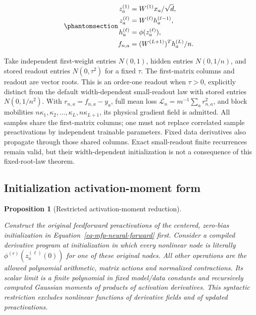 \documentclass[
  11pt,
]{article}
\theoremstyle{definition}
\theoremstyle{plain}
\theoremstyle{plain}
\newtheorem{proposition}{Proposition}[section]
\theoremstyle{plain}
\theoremstyle{remark}
\begin{document}
\begin{equation}\protect\phantomsection\label{eq-mfp-neural-forward}{
\begin{aligned}
z_a^{(1)}&=W^{(1)}x_a/\sqrt d,\\
z_a^{(\ell)}&=W^{(\ell)}h_a^{(\ell-1)},\\
h_a^{(\ell)}&=\phi(z_a^{(\ell)}),\\
f_{n,a}&=(W^{(L+1)})^Th_a^{(L)}/n.
\end{aligned}
}\end{equation}

Take independent first-weight entries \(N(0,1)\), hidden entries
\(N(0,1/n)\), and stored readout entries \(N(0,\tau^2)\) for a fixed
\(\tau\). The first-matrix columns and readout are vector roots. This is
an order-one readout when \(\tau>0\), explicitly distinct from the
default width-dependent small-readout law with stored entries
\(N(0,1/n^2)\). With \(r_{n,a}=f_{n,a}-y_a\), full mean loss
\(\mathcal L_n=m^{-1}\sum_a r_{n,a}^2\), and block mobilities
\(n\kappa_1,\kappa_2,\ldots,\kappa_L,n\kappa_{L+1}\), its physical
gradient field is admitted. All samples share the first-matrix columns;
one must not replace correlated sample preactivations by independent
trainable parameters. Fixed data derivatives also propagate through
those shared columns. Exact small-readout finite recurrences remain
valid, but their width-dependent initialization is not a consequence of
this fixed-root-law theorem.

\subsection{Initialization activation-moment
form}\label{sec-mfp-initialization-normal-form}

\begin{proposition}[Restricted activation-moment
reduction]\protect\hypertarget{prp-mfp-initialization-normal-form}{}\label{prp-mfp-initialization-normal-form}

Construct the original feedforward preactivations of the centered,
zero-bias initialization in Equation~\ref{eq-mfp-neural-forward} first.
Consider a compiled derivative program at initialization in which every
nonlinear node is literally \(\phi^{(r)}(z_a^{(\ell)}(0))\) for one of
these original nodes. All other operations are the allowed polynomial
arithmetic, matrix actions and normalized contractions. Its scalar limit
is a finite polynomial in fixed model/data constants and recursively
computed Gaussian moments of products of activation derivatives. This
syntactic restriction excludes nonlinear functions of derivative fields
and of updated preactivations.

\end{proposition}
\end{document}
